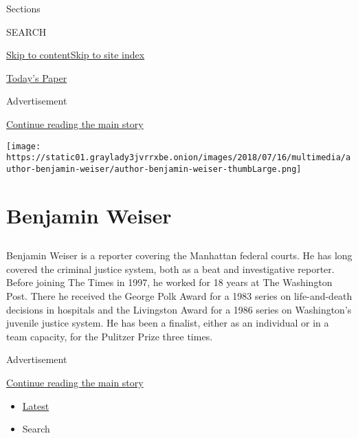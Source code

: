 Sections

SEARCH

\protect\hyperlink{site-content}{Skip to
content}\protect\hyperlink{site-index}{Skip to site index}

\href{https://myaccount.nytimes3xbfgragh.onion/auth/login?response_type=cookie\&client_id=vi}{}

\href{https://www.nytimes3xbfgragh.onion/section/todayspaper}{Today's
Paper}

Advertisement

\protect\hyperlink{after-top}{Continue reading the main story}

\texttt{[image: https://static01.graylady3jvrrxbe.onion/images/2018/07/16/multimedia/author-benjamin-weiser/author-benjamin-weiser-thumbLarge.png]}

\hypertarget{benjamin-weiser}{%
\section{Benjamin Weiser}\label{benjamin-weiser}}

\subsection{}

Benjamin Weiser is a reporter covering the Manhattan federal courts. He
has long covered the criminal justice system, both as a beat and
investigative reporter. Before joining The Times in 1997, he worked for
18 years at The Washington Post. There he received the George Polk Award
for a 1983 series on life-and-death decisions in hospitals and the
Livingston Award for a 1986 series on Washington's juvenile justice
system. He has been a finalist, either as an individual or in a team
capacity, for the Pulitzer Prize three times.

Advertisement

\protect\hyperlink{after-mid1}{Continue reading the main story}

\begin{itemize}
\tightlist
\item
  \protect\hyperlink{stream-panel}{Latest}
\item
  Search
\end{itemize}

